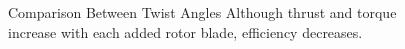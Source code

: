 \documentclass{article}
\begin{document}
\begin{figure}
  \centering
  \caption{Comparison Between Twist Angles \newline Although thrust and torque increase with each added rotor blade, efficiency decreases.}
  \label{fig:6}
\end{figure}

\clearpage
\end{document}
